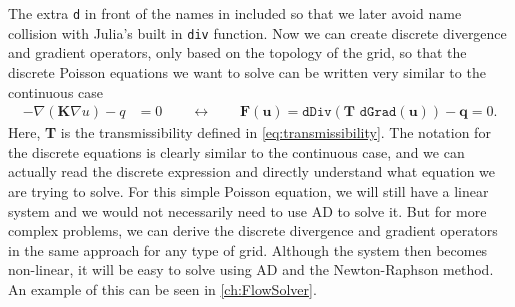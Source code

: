 The extra \texttt{d} in front of the names in included so that we later avoid name collision with Julia's built in \texttt{div} function. Now we can create discrete divergence and gradient operators, only based on the topology of the grid, so that the discrete Poisson equations we want to solve can be written very similar to the continuous case
\begin{align*}
    -\nabla(\textbf{K}\nabla u) - q &= 0 \qquad \longleftrightarrow\qquad
    \textbf{F}(\textbf{u}) = \texttt{dDiv}(\textbf{T }\texttt{dGrad}(\textbf{u}))-\textbf{q} 
    = 0.
\end{align*}
Here, \textbf{T} is the transmissibility defined in \eqref{eq:transmissibility}. The notation for the discrete equations is clearly similar to the continuous case, and we can actually read the discrete expression and directly understand what equation we are trying to solve. For this simple Poisson equation, we will still have a linear system and we would not necessarily need to use AD to solve it. But for more complex problems, we can derive the discrete divergence and gradient operators in the same approach for any type of grid. Although the system then becomes non-linear, it will be easy to solve using AD and the Newton-Raphson method. An example of this can be seen in \autoref{ch:FlowSolver}.

 




























